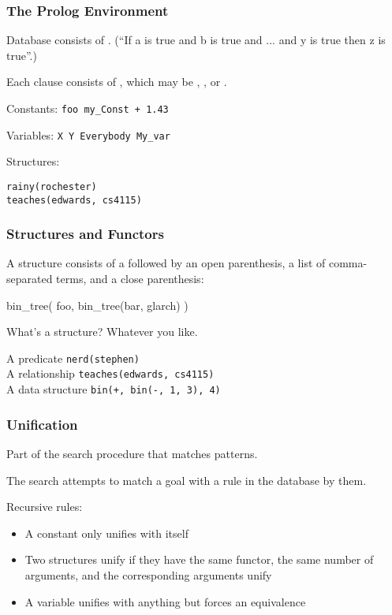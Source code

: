 \documentclass{plt}
\newcommand{\lab}[3]{\tikz{\useasboundingbox (0,0);
    \node [draw=black, anchor=west,fill=black!10,rectangle callout,
      callout absolute pointer={(1pt,3pt)}]
  at (#1,#2) {\rmfamily{\textcolor{black}{#3}}}; 
}}
\begin{document}
\begin{frame}[fragile]
  \frametitle{The Prolog Environment}

Database consists of . (``If a is true and b is true and ... and y is true then z is true''.)

Each clause consists of , which may be ,
, or .

Constants: \texttt{foo my\_Const + 1.43}

Variables: \texttt{X Y Everybody My\_var}

Structures: \begin{minipage}[t]{0.5\textwidth}
\begin{verbatim}
rainy(rochester)
teaches(edwards, cs4115)
\end{verbatim}
\end{minipage}

\end{frame}

\begin{frame}[fragile]
  \frametitle{Structures and Functors}

A structure consists of a  followed by an open
parenthesis, a list of comma-separated terms, and a close parenthesis:

\vspace{3pc}

\begin{semiverbatim}
\lab{-1pc}{4.5pc}{``Functor''}bin_tree(\lab{-2pc}{2pc}{paren must follow immediately} foo, bin_tree(bar, glarch) )
\end{semiverbatim}

What's a structure?  Whatever you like.

A predicate \texttt{nerd(stephen)} \\
A relationship \texttt{teaches(edwards, cs4115)} \\
A data structure \texttt{bin(+, bin(-, 1, 3), 4)}

\end{frame}

\begin{frame}
  \frametitle{Unification}

Part of the search procedure that matches patterns.

The search attempts to match a goal with a rule in the database by
 them.

Recursive rules:

\begin{itemize}
\item A constant only unifies with itself
\item Two structures unify if they have the same functor, the same
number of arguments, and the corresponding arguments unify
\item A variable unifies with anything but forces an equivalence
\end{itemize}

\end{frame}
\end{document}
